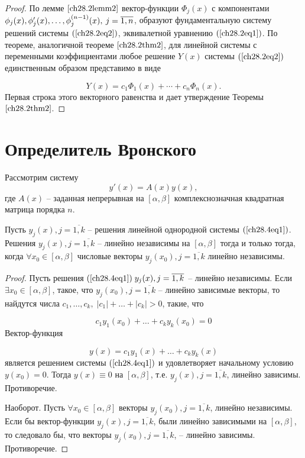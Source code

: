 \begin{proof}
По лемме $\ref{ch28.2lemm2}$ вектор-функции $\Phi_j(x)$ с компонентами $\phi_j(x),\\ \phi'_j(x), \ldots, \phi^{(n - 1)}_j(x), \: j = \overline{1,n}$, образуют фундаментальную систему решений системы $(\ref{ch28.2eq2})$, эквивалетной уравнению $(\ref{ch28.2eq1})$. По теореме, аналогичной теореме $\ref{ch28.2thm2}$, для линейной системы с переменными коэффициентами любое решение $Y(x)$ системы $(\ref{ch28.2eq2})$ единственным образом представимо в виде

$$
Y(x) = c_1 \Phi_1(x) + \cdots + c_n \Phi_n(x).
$$
Первая строка этого векторного равенства и дает утверждение Теоремы $\ref{ch28.2thm2}$.
\end{proof}
\section{Определитель Вронского}

Рассмотрим систему 
\begin{equation} \label{ch28.4eq1}
y'(x) = A(x)y(x),
\end{equation}
где $A(x)$ -- заданная непрерывная на $[\alpha, \beta]$ комплекснозначная квадратная матрица порядка $n$.

\begin{thm} \label{ch28.3thm1}
Пусть $y_j(x), j = \overline{1,k}$ -- решения линейной однородной системы $(\ref{ch28.4eq1})$. Решения $y_j(x), j = \overline{1,k}$ -- линейно независимы на $[\alpha, \beta]$ тогда и только тогда, когда $\forall x_0 \in [\alpha, \beta]$ числовые векторы $y_j(x_0), j = \overline{1,k}$ линейно независимы.
\end{thm}

\begin{proof}
Пусть решения $(\ref{ch28.4eq1}) \; y_j(x), j = \overline{1,k}$ -- линейно независимы. Если $\exists x_0 \in [\alpha, \beta]$, такое, что $y_j(x_0), j = \overline{1,k}$ -- линейно зависимые векторы, то найдутся числа $c_1, \ldots, c_k, \; |c_1| + \ldots + |c_k| > 0$, такие, что

$$
c_1y_1(x_0) + \ldots + c_k y_k(x_0) = 0
$$
Вектор-функция

$$
y(x) = c_1y_1(x) + \ldots + c_k y_k(x)
$$
является решением системы $(\ref{ch28.4eq1})$ и удовлетворяет начальному условию $y(x_0) = 0$. Тогда $y(x) \equiv 0$ на $[\alpha, \beta]$, т.е. $y_j(x), j = \overline{1,k}$, линейно зависимы. Противоречие.

Наоборот. Пусть $\forall x_0 \in [\alpha, \beta]$ векторы $y_j(x_0), j = \overline{1,k}$, линейно независимы. Если бы вектор-функции $y_j(x), j = \overline{1,k}$, были линейно зависимыми на $[\alpha,\beta]$, то следовало бы, что векторы $y_j(x_0), j = \overline{1,k}$, -- линейно зависимы. Противоречие.
\end{proof}

